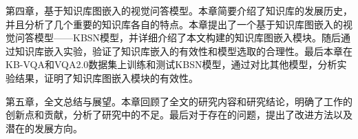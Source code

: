 第四章，基于知识库图嵌入的视觉问答模型。本章简要介绍了知识库的发展历史，并且分析了几个重要的知识库各自的特点。本章提出了一个基于知识库图嵌入的视觉问答模型——KBSN模型，并详细介绍了本文构建的知识库图嵌入模块。随后通过知识库嵌入实验，验证了知识库嵌入的有效性和模型选取的合理性。最后本章在KB-VQA和VQA2.0数据集上训练和测试KBSN模型，通过对比其他模型，分析实验结果，证明了知识库图嵌入模块的有效性。

第五章，全文总结与展望。本章回顾了全文的研究内容和研究结论，明确了工作的创新点和贡献，分析了研究中的不足。最后对于存在的问题，提出了改进方法以及潜在的发展方向。

